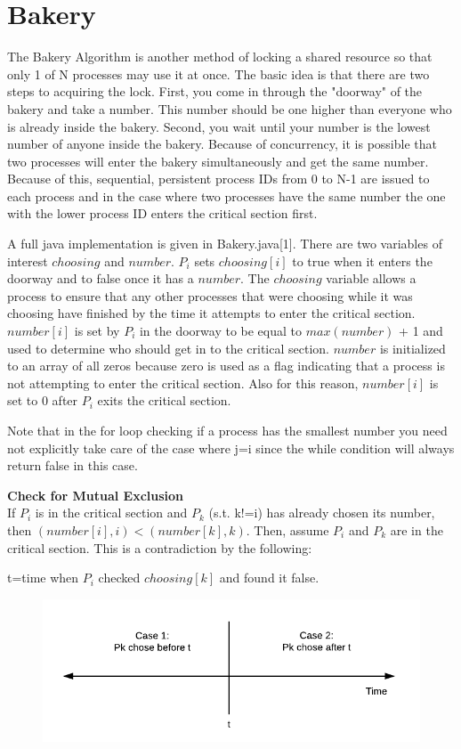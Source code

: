 \documentclass[twoside]{article}
\begin{document}
\section{Bakery}
The Bakery Algorithm is another method of locking a shared resource so that only 1 of N processes may use it at once.  The basic idea is that there are two steps to acquiring the lock.  First, you come in through the "doorway" of the bakery and take a number.  This number should be one higher than everyone who is already inside the bakery.  Second, you wait until your number is the lowest number of anyone inside the bakery.  Because of concurrency, it is possible that two processes will enter the bakery simultaneously and get the same number.  Because of this, sequential, persistent process IDs from 0 to N-1 are issued to each process and in the case where two processes have the same number the one with the lower process ID enters the critical section first.

A full java implementation is given in Bakery.java[1].  There are two variables of interest $choosing$ and $number$.  $P_i$ sets $choosing[i]$ to true when it enters the doorway and to false once it has a $number$.  The $choosing$ variable allows a process to ensure that any other processes that were choosing while it was choosing have finished by the time it attempts to enter the critical section.  $number[i]$ is set by $P_i$ in the doorway to be equal to $max(number)$ + 1 and used to determine who should get in to the critical section.  $number$ is initialized to an array of all zeros because zero is used as a flag indicating that a process is not attempting to enter the critical section.  Also for this reason, $number[i]$ is set to 0 after $P_i$ exits the critical section.

Note that in the for loop checking if a process has the smallest number you need not explicitly take care of the case where j=i since the while condition will always return false in this case.

{\bf Check for Mutual Exclusion}\\
If $P_i$ is in the critical section and $P_k$ (s.t. k!=i) has already chosen its number, then $(number[i], i) < (number[k], k)$.  Then, assume $P_i$ and $P_k$ are in the critical section.  This is a contradiction by the following:

t=time when $P_i$ checked $choosing[k]$ and found it false.
\begin{figure}[h]
\includegraphics[scale=.5]{bakeryprooffig1}
\centering
\end{figure}
\end{document}
